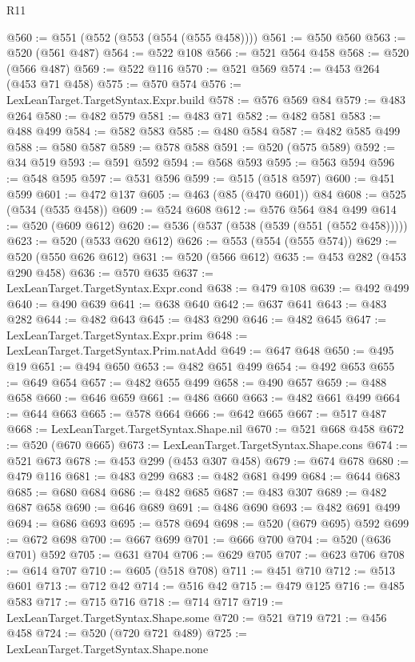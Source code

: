 \begin{lexlean}{R11}
\begin{coremodule}
@560 := @551 (@552 (@553 (@554 (@555 @458))))
@561 := @550 @560
@563 := @520 (@561 @487)
@564 := @522 @108
@566 := @521 @564 @458
@568 := @520 (@566 @487)
@569 := @522 @116
@570 := @521 @569
@574 := @453 @264 (@453 @71 @458)
@575 := @570 @574
@576 := LexLeanTarget.TargetSyntax.Expr.build
@578 := @576 @569 @84
@579 := @483 @264
@580 := @482 @579
@581 := @483 @71
@582 := @482 @581
@583 := @488 @499
@584 := @582 @583
@585 := @480 @584
@587 := @482 @585 @499
@588 := @580 @587
@589 := @578 @588
@591 := @520 (@575 @589)
@592 := @34 @519
@593 := @591 @592
@594 := @568 @593
@595 := @563 @594
@596 := @548 @595
@597 := @531 @596
@599 := @515 (@518 @597)
@600 := @451 @599
@601 := @472 @137
@605 := @463 (@85 (@470 @601)) @84
@608 := @525 (@534 (@535 @458))
@609 := @524 @608
@612 := @576 @564 @84 @499
@614 := @520 (@609 @612)
@620 := @536 (@537 (@538 (@539 (@551 (@552 @458)))))
@623 := @520 (@533 @620 @612)
@626 := @553 (@554 (@555 @574))
@629 := @520 (@550 @626 @612)
@631 := @520 (@566 @612)
@635 := @453 @282 (@453 @290 @458)
@636 := @570 @635
@637 := LexLeanTarget.TargetSyntax.Expr.cond
@638 := @479 @108
@639 := @492 @499
@640 := @490 @639
@641 := @638 @640
@642 := @637 @641
@643 := @483 @282
@644 := @482 @643
@645 := @483 @290
@646 := @482 @645
@647 := LexLeanTarget.TargetSyntax.Expr.prim
@648 := LexLeanTarget.TargetSyntax.Prim.natAdd
@649 := @647 @648
@650 := @495 @19
@651 := @494 @650
@653 := @482 @651 @499
@654 := @492 @653
@655 := @649 @654
@657 := @482 @655 @499
@658 := @490 @657
@659 := @488 @658
@660 := @646 @659
@661 := @486 @660
@663 := @482 @661 @499
@664 := @644 @663
@665 := @578 @664
@666 := @642 @665
@667 := @517 @487
@668 := LexLeanTarget.TargetSyntax.Shape.nil
@670 := @521 @668 @458
@672 := @520 (@670 @665)
@673 := LexLeanTarget.TargetSyntax.Shape.cons
@674 := @521 @673
@678 := @453 @299 (@453 @307 @458)
@679 := @674 @678
@680 := @479 @116
@681 := @483 @299
@683 := @482 @681 @499
@684 := @644 @683
@685 := @680 @684
@686 := @482 @685
@687 := @483 @307
@689 := @482 @687 @658
@690 := @646 @689
@691 := @486 @690
@693 := @482 @691 @499
@694 := @686 @693
@695 := @578 @694
@698 := @520 (@679 @695) @592
@699 := @672 @698
@700 := @667 @699
@701 := @666 @700
@704 := @520 (@636 @701) @592
@705 := @631 @704
@706 := @629 @705
@707 := @623 @706
@708 := @614 @707
@710 := @605 (@518 @708)
@711 := @451 @710
@712 := @513 @601
@713 := @712 @42
@714 := @516 @42
@715 := @479 @125
@716 := @485 @583
@717 := @715 @716
@718 := @714 @717
@719 := LexLeanTarget.TargetSyntax.Shape.some
@720 := @521 @719
@721 := @456 @458
@724 := @520 (@720 @721 @489)
@725 := LexLeanTarget.TargetSyntax.Shape.none

\end{coremodule}
\end{lexlean}
